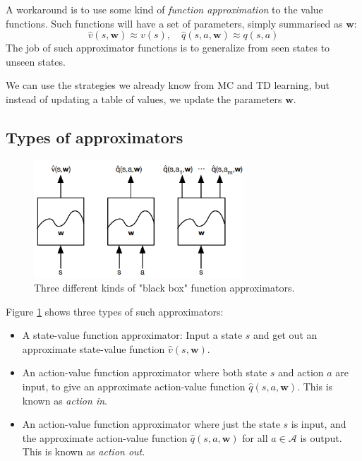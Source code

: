 \documentclass[12pt, a4paper]{article}
\numberwithin{equation}{section}
\begin{document}
A workaround is to use some kind of \textit{function approximation} to the value functions. Such functions will have a set of parameters, simply summarised as $\mathbf{w}$:
\begin{equation}
\hat{v}(s,\mathbf{w})\approx v(s),\quad\hat{q}(s,a,\mathbf{w})\approx q(s,a)
\end{equation}
The job of such approximator functions is to generalize from seen states to unseen states.

We can use the strategies we already know from MC and TD learning, but instead of updating a table of values, we update the parameters $\mathbf{w}$.

\subsection{Types of approximators}

\begin{figure}
\centering
\includegraphics[width=0.7\textwidth]{approximators}
\caption{Three different kinds of "black box" function approximators.}
\label{fig:approximators}
\end{figure}

Figure \ref{fig:approximators} shows three types of such approximators:
\begin{itemize}
\item A state-value function approximator: Input a state $s$ and get out an approximate state-value function $\hat{v}(s,\mathbf{w})$.
\item An action-value function approximator where both state $s$ and action $a$ are input, to give an approximate action-value function $\hat{q}(s,a,\mathbf{w})$. This is known as \textit{action in}.
\item An action-value function approximator where just the state $s$ is input, and the approximate action-value function $\hat{q}(s,a,\mathbf{w})$ for all $a\in\mathcal{A}$ is output. This is known as \textit{action out}.
\end{itemize}
\end{document}
